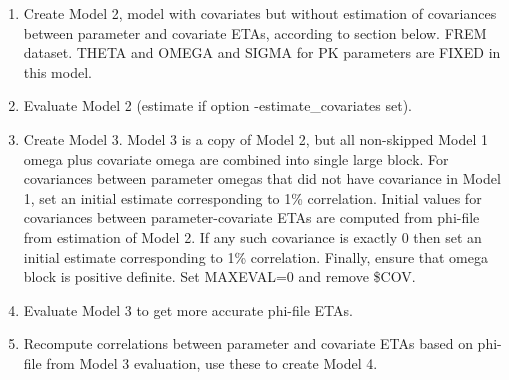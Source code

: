 \begin{enumerate}
\item Create Model 2, model with covariates but without
estimation of covariances between parameter and covariate ETAs,
according to section below. FREM dataset.
THETA and OMEGA and SIGMA for PK parameters are FIXED in this model.
\item Evaluate Model 2 (estimate if option -estimate\_covariates set).
\item Create Model 3.
Model 3 is a copy of Model 2, but all non-skipped Model 1 omega plus covariate omega are combined
into single large block. For covariances between parameter omegas that did
not have covariance in Model 1, set %
an initial estimate corresponding to 1\% correlation.
Initial values for covariances between parameter-covariate ETAs are computed from
phi-file from estimation of Model 2. If any such covariance is exactly 0 then set
an initial estimate corresponding to 1\% correlation.
Finally, ensure that omega block is positive definite.
Set MAXEVAL=0 and remove \$COV.
\item Evaluate Model 3 to get more accurate phi-file ETAs.
\item Recompute correlations
between parameter and covariate ETAs based on phi-file from Model 3 evaluation,
use these to create Model 4.


\end{enumerate}
